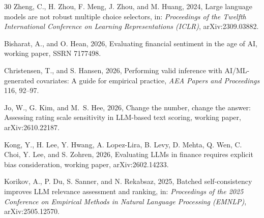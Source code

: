 \begin{thebibliography}{30}
Zheng, C., H. Zhou, F. Meng, J. Zhou, and M. Huang, 2024, Large language models are not robust multiple choice selectors, in: \emph{Proceedings of the Twelfth International Conference on Learning Representations (ICLR)}, arXiv:2309.03882.

Bisharat, A., and O. Hean, 2026, Evaluating financial sentiment in the age of {AI}, working paper, SSRN 7177498.

Christensen, T., and S. Hansen, 2026, Performing valid inference with {AI/ML}-generated covariates: {A} guide for empirical practice, \emph{AEA Papers and Proceedings} 116, 92--97.

Jo, W., G. Kim, and M.~S. Hee, 2026, Change the number, change the answer: {A}ssessing rating scale sensitivity in {LLM}-based text scoring, working paper, arXiv:2610.22187.

Kong, Y., H. Lee, Y. Hwang, A. Lopez-Lira, B. Levy, D. Mehta, Q. Wen, C. Choi, Y. Lee, and S. Zohren, 2026, Evaluating {LLM}s in finance requires explicit bias consideration, working paper, arXiv:2602.14233.

Korikov, A., P. Du, S. Sanner, and N. Rekabsaz, 2025, Batched self-consistency improves {LLM} relevance assessment and ranking, in: \emph{Proceedings of the 2025 Conference on Empirical Methods in Natural Language Processing (EMNLP)}, arXiv:2505.12570.

\end{thebibliography}
